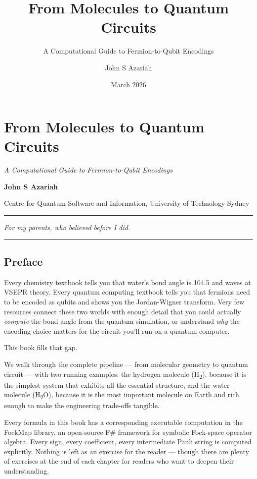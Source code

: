 \documentclass[
  11pt,
  oneside]{book}
\title{From Molecules to Quantum Circuits}
\subtitle{A Computational Guide to Fermion-to-Qubit Encodings}
\author{John S Azariah}
\date{March 2026}
\begin{document}
\frontmatter
\maketitle

{
\hypersetup{linkcolor=}
\setcounter{tocdepth}{1}
\tableofcontents
}
\mainmatter
\chapter{From Molecules to Quantum
Circuits}\label{from-molecules-to-quantum-circuits}

\emph{A Computational Guide to Fermion-to-Qubit Encodings}

\textbf{John S Azariah}

Centre for Quantum Software and Information, University of Technology
Sydney

\begin{center}\rule{0.5\linewidth}{0.5pt}\end{center}

\emph{For my parents, who believed before I did.}

\begin{center}\rule{0.5\linewidth}{0.5pt}\end{center}

\section{Preface}\label{preface}

Every chemistry textbook tells you that water's bond angle is 104.5\textdegree{} and
waves at VSEPR theory. Every quantum computing textbook tells you that
fermions need to be encoded as qubits and shows you the Jordan-Wigner
transform. Very few resources connect these two worlds with enough
detail that you could actually \emph{compute} the bond angle from the
quantum simulation, or understand \emph{why} the encoding choice matters
for the circuit you'll run on a quantum computer.

This book fills that gap.

We walk through the complete pipeline --- from molecular geometry to
quantum circuit --- with two running examples: the hydrogen molecule
(H\textsubscript{2}), because it is the simplest system that exhibits all the essential
structure, and the water molecule (H\textsubscript{2}O), because it is the most
important molecule on Earth and rich enough to make the engineering
trade-offs tangible.

Every formula in this book has a corresponding executable computation in
the FockMap library, an open-source F\# framework for symbolic
Fock-space operator algebra. Every sign, every coefficient, every
intermediate Pauli string is computed explicitly. Nothing is left as an
exercise for the reader --- though there are plenty of exercises at the
end of each chapter for readers who want to deepen their understanding.
\end{document}
